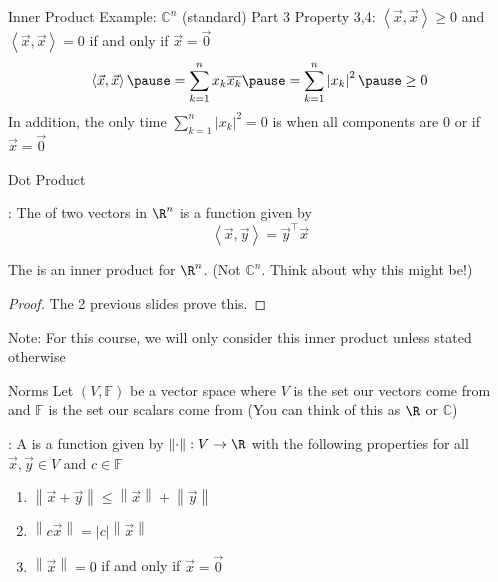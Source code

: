 \documentclass[xcoler=dvipsnames, aspectratio=169]{beamer}
\newcommand{\C}{\mathbb{C}}
\newcommand{\F}{\mathbb{F}}
\newcommand{\abs}[1]{\left|#1\right|}
\newcommand{\norm}[1]{\left\|#1\right\|}
\newcommand{\ip}[2]{\left\langle #1,#2\right\rangle}
\begin{document}
    \begin{frame}{Inner Product Example: $\C^n$ (standard) Part 3}
        Property 3,4: $\ip{\vec{x}}{\vec{x}}\geq 0$ and $\ip{\vec{x}}{\vec{x}} = 0$ if and only if
        $\vec{x} = \vec{0}$
        \[
            \ip{\vec{x}}{\vec{x}}\pause = \sum_{k=1}^n x_k\overline{x_k}
            \pause = \sum_{k=1}^n \abs{x_k}^2\pause \geq 0
        \]\pause
        In addition, the only time $\sum_{k=1}^n \abs{x_k}^2=0$ is when all components are 0 or
        if $\vec{x}=\vec{0}$
    \end{frame}
    \begin{frame}{Dot Product}
        \begin{defn}
            : The  of two vectors in $\R^n$ is a function given by
            \[
                \ip{\vec{x}}{\vec{y}} = \vec{y}^\top\vec{x}
            \]
        \end{defn}\pause
        \begin{theorem}
            The  is an inner product for $\R^n$. (Not $\C^n$. Think about why this might be!)
        \end{theorem}\pause
        \begin{proof}
            The 2 previous slides prove this.
        \end{proof}\pause
        Note: For this course, we will only consider this inner product unless stated otherwise
    \end{frame}
    \begin{frame}{Norms}
        Let $(V,\F)$ be a vector space where $V$ is the set our vectors come from and $\F$ is the
        set our scalars come from (You can think of this as $\R$ or $\C$)\pause
        \begin{defn}
            : A  is a function given by $\norm{\cdot}:V\rightarrow\R$
            with the following properties for all $\vec{x},\vec{y}\in V$ and $c\in\F$
            \begin{enumerate}
                \pause\item $\norm{\vec{x} + \vec{y}}\leq \norm{\vec{x}} + \norm{\vec{y}}$
                \pause\item $\norm{c\vec{x}} = \abs{c}\norm{\vec{x}}$
                \pause\item $\norm{\vec{x}} = 0$ if and only if $\vec{x} = \vec{0}$
            \end{enumerate}
        \end{defn}
    \end{frame}
\end{document}
